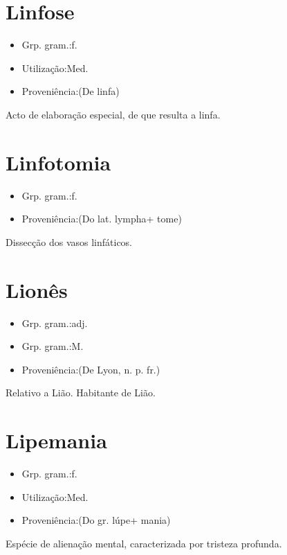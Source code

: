 \section{Linfose}
\begin{itemize}
\item {Grp. gram.:f.}
\end{itemize}
\begin{itemize}
\item {Utilização:Med.}
\end{itemize}
\begin{itemize}
\item {Proveniência:(De \textunderscore linfa\textunderscore )}
\end{itemize}
Acto de elaboração especial, de que resulta a linfa.
\section{Linfotomia}
\begin{itemize}
\item {Grp. gram.:f.}
\end{itemize}
\begin{itemize}
\item {Proveniência:(Do lat. \textunderscore lympha\textunderscore  + \textunderscore tome\textunderscore )}
\end{itemize}
Dissecção dos vasos linfáticos.
\section{Lionês}
\begin{itemize}
\item {Grp. gram.:adj.}
\end{itemize}
\begin{itemize}
\item {Grp. gram.:M.}
\end{itemize}
\begin{itemize}
\item {Proveniência:(De \textunderscore Lyon\textunderscore , n. p. fr.)}
\end{itemize}
Relativo a Lião.
Habitante de Lião.
\section{Lipemania}
\begin{itemize}
\item {Grp. gram.:f.}
\end{itemize}
\begin{itemize}
\item {Utilização:Med.}
\end{itemize}
\begin{itemize}
\item {Proveniência:(Do gr. \textunderscore lúpe\textunderscore  + \textunderscore mania\textunderscore )}
\end{itemize}
Espécie de alienação mental, caracterizada por tristeza profunda.
